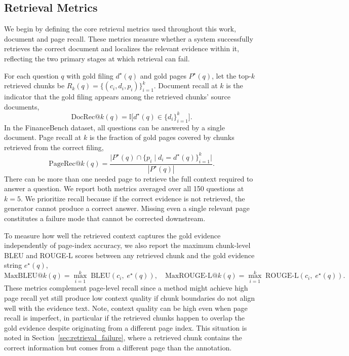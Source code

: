 \documentclass[12pt,twoside,maitrise]{dms}
\theoremstyle{definition}
\numberwithin{equation}{section}
\numberwithin{table}{chapter}
\numberwithin{figure}{chapter}
\begin{document}
\subsection{Retrieval Metrics}


We begin by defining the core retrieval metrics used throughout this work, document and page recall. These metrics
measure whether a system successfully retrieves the correct document and localizes the
relevant evidence within it, reflecting the two primary stages at which retrieval can fail. 

For each question $q$ with gold filing $d^\star(q)$ and gold pages $P^\star(q)$, let
the top-$k$ retrieved chunks be $R_k(q) = \{(c_i, d_i, p_i)\}_{i=1}^k$. Document
recall at $k$ is the indicator that the gold filing appears among the retrieved chunks'
source documents,
\begin{equation}
  \text{DocRec@}k(q) = \mathbb{I}\!\bigl[d^\star(q) \in \{d_i\}_{i=1}^k\bigr].
  \label{eq:docrecall}
\end{equation}
In the FinanceBench dataset, all questions can be answered by a single document. Page recall at $k$ is the fraction of gold pages covered by chunks retrieved from the
correct filing,
\begin{equation}
  \text{PageRec@}k(q) =
  \frac{\bigl|P^\star(q) \cap \{p_i \mid d_i = d^\star(q)\}_{i=1}^k\bigr|}
       {\,|P^\star(q)|\,}.
  \label{eq:pagerecall}
\end{equation}
There can be more than one needed page to retrieve the full context required to answer a question. We report both metrics averaged over all 150 questions at $k=5$.  We prioritize recall because if the
correct evidence is not retrieved, the generator cannot produce a correct answer. Missing even a single relevant page constitutes a failure mode that cannot be corrected
downstream.

To measure how well the retrieved context captures the gold evidence independently of
page-index accuracy, we also report the maximum chunk-level BLEU \citep{papineni2002bleu}
and ROUGE-L \citep{lin2004rouge} scores between any retrieved chunk and the gold
evidence string $e^\star(q)$,
\begin{equation}
  \text{MaxBLEU@}k(q)    = \max_{i=1}^{k}\;\text{BLEU}(c_i,\; e^\star(q)),
  \quad
  \text{MaxROUGE-L@}k(q) = \max_{i=1}^{k}\;\text{ROUGE-L}(c_i,\; e^\star(q)).
\end{equation}
These metrics complement page-level recall since a method might achieve high page recall yet
still produce low context quality if chunk boundaries do not align well with the
evidence text. Note, context quality can be high even when page recall is
imperfect, in particular if the retrieved chunks happen to overlap the gold evidence despite originating
from a different page index. This situation is noted in
Section~\ref{sec:retrieval_failure}, where a retrieved chunk contains the correct
information but comes from a different page than the annotation.
\end{document}
